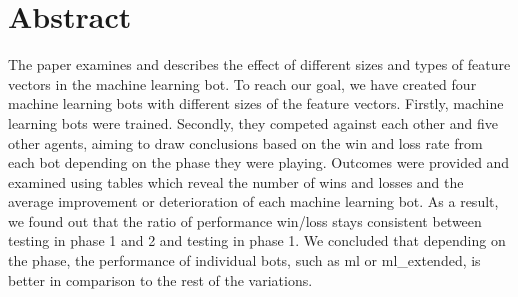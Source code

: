 \documentclass[master]{subfiles}
\begin{document}
\section{Abstract}
The paper examines and describes the effect of different sizes and types of feature vectors in the machine learning bot. To reach our goal, we have created four machine learning bots with different sizes of the feature vectors. Firstly, machine learning bots were trained. Secondly, they competed against each other and five other agents, aiming to draw conclusions based on the win and loss rate from each bot depending on the phase they were playing. Outcomes were provided and examined using tables which reveal the number of wins and losses and the average improvement or deterioration of each machine learning bot. As a result, we found out that the ratio of performance win/loss stays consistent between testing in phase 1 and 2 and testing in phase 1. We concluded that depending on the phase, the performance of individual bots, such as ml or ml\_extended, is better in comparison to the rest of the variations.
\end{document}
